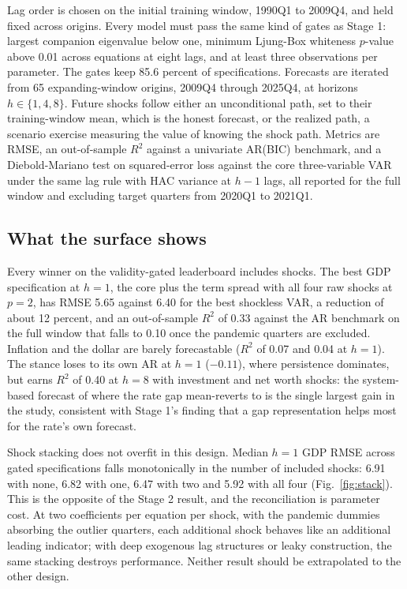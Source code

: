 \documentclass[conference]{IEEEtran}
\begin{document}
Lag order is chosen on the initial training window, 1990Q1 to 2009Q4, and held fixed across origins. Every model must pass the same kind of gates as Stage 1: largest companion eigenvalue below one, minimum Ljung-Box whiteness $p$-value above 0.01 across equations at eight lags, and at least three observations per parameter. The gates keep 85.6 percent of specifications. Forecasts are iterated from 65 expanding-window origins, 2009Q4 through 2025Q4, at horizons $h\in\{1,4,8\}$. Future shocks follow either an unconditional path, set to their training-window mean, which is the honest forecast, or the realized path, a scenario exercise measuring the value of knowing the shock path. Metrics are RMSE, an out-of-sample $R^2$ against a univariate AR(BIC) benchmark, and a Diebold-Mariano test on squared-error loss against the core three-variable VAR under the same lag rule with HAC variance at $h-1$ lags, all reported for the full window and excluding target quarters from 2020Q1 to 2021Q1.

\subsection{What the surface shows}
Every winner on the validity-gated leaderboard includes shocks. The best GDP specification at $h=1$, the core plus the term spread with all four raw shocks at $p=2$, has RMSE 5.65 against 6.40 for the best shockless VAR, a reduction of about 12 percent, and an out-of-sample $R^2$ of 0.33 against the AR benchmark on the full window that falls to 0.10 once the pandemic quarters are excluded. Inflation and the dollar are barely forecastable ($R^2$ of 0.07 and 0.04 at $h=1$). The stance loses to its own AR at $h=1$ ($-0.11$), where persistence dominates, but earns $R^2$ of 0.40 at $h=8$ with investment and net worth shocks: the system-based forecast of where the rate gap mean-reverts to is the single largest gain in the study, consistent with Stage 1's finding that a gap representation helps most for the rate's own forecast.

Shock stacking does not overfit in this design. Median $h=1$ GDP RMSE across gated specifications falls monotonically in the number of included shocks: 6.91 with none, 6.82 with one, 6.47 with two and 5.92 with all four (Fig.~\ref{fig:stack}). This is the opposite of the Stage 2 result, and the reconciliation is parameter cost. At two coefficients per equation per shock, with the pandemic dummies absorbing the outlier quarters, each additional shock behaves like an additional leading indicator; with deep exogenous lag structures or leaky construction, the same stacking destroys performance. Neither result should be extrapolated to the other design.
\end{document}
